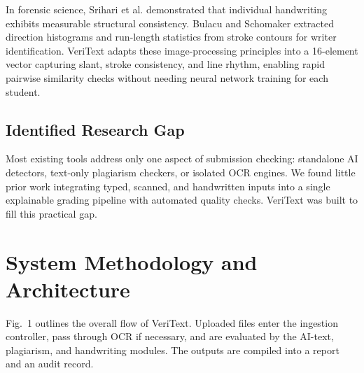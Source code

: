 \documentclass[conference]{IEEEtran}
\begin{document}
In forensic science, Srihari et al. \cite{srihari2002individuality} demonstrated that individual handwriting exhibits measurable structural consistency. Bulacu and Schomaker \cite{bulacu2007text} extracted direction histograms and run-length statistics from stroke contours for writer identification. VeriText adapts these image-processing principles into a 16-element vector capturing slant, stroke consistency, and line rhythm, enabling rapid pairwise similarity checks without needing neural network training for each student.

\subsection{Identified Research Gap}
Most existing tools address only one aspect of submission checking: standalone AI detectors, text-only plagiarism checkers, or isolated OCR engines. We found little prior work integrating typed, scanned, and handwritten inputs into a single explainable grading pipeline with automated quality checks. VeriText was built to fill this practical gap.

\section{System Methodology and Architecture}

Fig.~1 outlines the overall flow of VeriText. Uploaded files enter the ingestion controller, pass through OCR if necessary, and are evaluated by the AI-text, plagiarism, and handwriting modules. The outputs are compiled into a report and an audit record.
\end{document}
